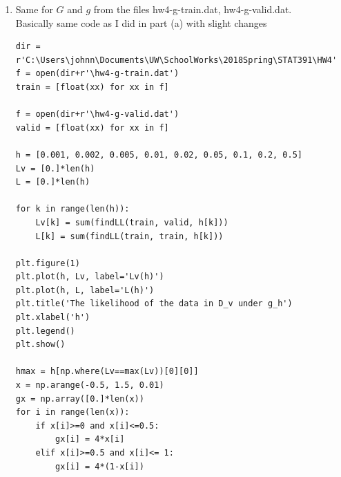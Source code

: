 \documentclass[preprint,12pt]{elsarticle}
\begin{document}
\begin{enumerate}[label=\alph*]
\begin{figure}[htbp!]
\begin{subfigure}{0.8\textwidth}
                \caption{$f_h^{*}(x)$ with real $f(x)$ at $h^{*} = 0.01$}
                \label{fig:42}
            \end{subfigure}
            \caption{The plot shows that the kernel density at $h^{*}$ is 
            pretty close to the real $f(x)$}
            \label{fig:4}
        \end{figure}
        The Figure\ref{fig:4} shows the result. As a result, $h^{*}$ I found is 
        \begin{spverbatim}
        >>> h[np.where(Lv==max(Lv))[0][0]]
        0.01
        \end{spverbatim}

        \item Same for $G$ and $g$ from the files hw4-g-train.dat, hw4-g-valid.dat.\\

        Basically same code as I did in part (a) with slight changes
        \begin{lstlisting}
dir = r'C:\Users\johnn\Documents\UW\SchoolWorks\2018Spring\STAT391\HW4'
f = open(dir+r'\hw4-g-train.dat')
train = [float(xx) for xx in f]

f = open(dir+r'\hw4-g-valid.dat')
valid = [float(xx) for xx in f]

h = [0.001, 0.002, 0.005, 0.01, 0.02, 0.05, 0.1, 0.2, 0.5]
Lv = [0.]*len(h)
L = [0.]*len(h)

for k in range(len(h)):
    Lv[k] = sum(findLL(train, valid, h[k]))
    L[k] = sum(findLL(train, train, h[k]))

plt.figure(1)
plt.plot(h, Lv, label='Lv(h)')
plt.plot(h, L, label='L(h)')
plt.title('The likelihood of the data in D_v under g_h')
plt.xlabel('h')
plt.legend()
plt.show()

hmax = h[np.where(Lv==max(Lv))[0][0]]
x = np.arange(-0.5, 1.5, 0.01)
gx = np.array([0.]*len(x))
for i in range(len(x)):
    if x[i]>=0 and x[i]<=0.5:
        gx[i] = 4*x[i]
    elif x[i]>=0.5 and x[i]<= 1:
        gx[i] = 4*(1-x[i])


\end{lstlisting}
\end{enumerate}
\end{document}
